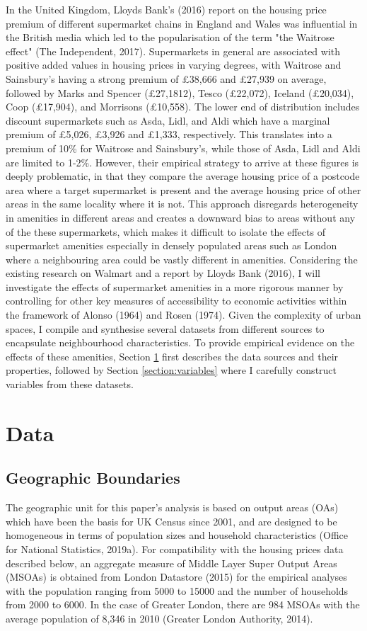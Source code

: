 \documentclass{article}
\begin{document}
In the United Kingdom, Lloyds Bank's (2016) report on the housing price premium of different supermarket chains in England and Wales was influential in the British media which led to the popularisation of the term "the Waitrose effect" (The Independent, 2017). Supermarkets in general are associated with positive added values in housing prices in varying degrees, with Waitrose and Sainsbury's having a strong premium of £38,666 and £27,939 on average, followed by Marks and Spencer (£27,1812), Tesco (£22,072), Iceland (£20,034), Coop (£17,904), and Morrisons (£10,558). The lower end of distribution includes discount supermarkets such as Asda, Lidl, and Aldi which have a marginal premium of £5,026, £3,926 and £1,333, respectively. This translates into a premium of 10\% for Waitrose and Sainsbury's, while those of Asda, Lidl and Aldi are limited to 1-2\%. However, their empirical strategy to arrive at these figures is deeply problematic, in that they compare the average housing price of a postcode area where a target supermarket is present and the average housing price of other areas in the same locality where it is not. This approach disregards heterogeneity in amenities in different areas and creates a downward bias to areas without any of the these supermarkets, which makes it difficult to isolate the effects of supermarket amenities especially in densely populated areas such as London where a neighbouring area could be vastly different in amenities. Considering the existing research on Walmart and a report by Lloyds Bank (2016), I will investigate the effects of supermarket amenities in a more rigorous manner by controlling for other key measures of accessibility to economic activities within the framework of Alonso (1964) and Rosen (1974). Given the complexity of urban spaces, I compile and synthesise several datasets from different sources to encapsulate neighbourhood characteristics. To provide empirical evidence on the effects of these amenities, Section \ref{section:data} first describes the data sources and their properties, followed by Section \ref{section:variables} where I carefully construct variables from these datasets.


\section{Data} \label{section:data}
\subsection{Geographic Boundaries} \label{subsection:boundaries}
The geographic unit for this paper's analysis is based on output areas (OAs) which have been the basis for UK Census since 2001, and are designed to be homogeneous in terms of population sizes and household characteristics (Office for National Statistics, 2019a). For compatibility with the housing prices data described below, an aggregate measure of Middle Layer Super Output Areas (MSOAs) is obtained from London Datastore (2015) for the empirical analyses with the population ranging from 5000 to 15000 and the number of households from 2000 to 6000. In the case of Greater London, there are 984 MSOAs with the average population of 8,346 in 2010 (Greater London Authority, 2014).
\end{document}
